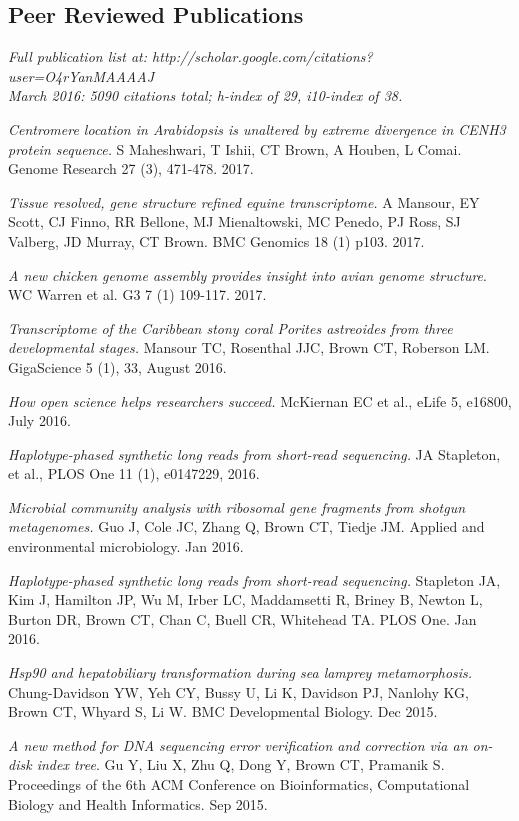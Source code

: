 \documentclass[margin,line]{resume}
\begin{document}
\begin{resume}
    \section{\mysidestyle Peer Reviewed Publications}

{\em Full publication list at: http://scholar.google.com/citations?user=O4rYanMAAAAJ\\
  March 2016: 5090 citations total; h-index of 29, i10-index of 38.}

{\em Centromere location in Arabidopsis is unaltered by extreme divergence in CENH3 protein sequence.} S Maheshwari, T Ishii, CT Brown, A Houben, L Comai. Genome Research 27 (3), 471-478. 2017.

{\em Tissue resolved, gene structure refined equine transcriptome.} A Mansour, EY Scott, CJ Finno, RR Bellone, MJ Mienaltowski, MC Penedo, PJ Ross, SJ Valberg, JD Murray, CT Brown. BMC Genomics 18 (1) p103. 2017.

{\em A new chicken genome assembly provides insight into avian genome structure}. WC Warren et al. G3 7 (1) 109-117. 2017.

{\em Transcriptome of the Caribbean stony coral Porites astreoides from three developmental stages.} Mansour TC, Rosenthal JJC, Brown CT, Roberson LM.
GigaScience 5 (1), 33, August 2016.

{\em How open science helps researchers succeed.}
McKiernan EC et al., eLife 5, e16800, July 2016.

{\em Haplotype-phased synthetic long reads from short-read sequencing.}
JA Stapleton, et al.,
PLOS One 11 (1), e0147229, 2016.

{\em Microbial community analysis with ribosomal gene fragments from shotgun metagenomes.} Guo J, Cole JC, Zhang Q, Brown CT, Tiedje JM. Applied and environmental microbiology. Jan 2016.

{\em Haplotype-phased synthetic long reads from short-read sequencing.} Stapleton JA, Kim J, Hamilton JP, Wu M, Irber LC, Maddamsetti R, Briney B, Newton L, Burton DR, Brown CT, Chan C, Buell CR, Whitehead TA. PLOS One. Jan 2016.

{\em Hsp90 and hepatobiliary transformation during sea lamprey metamorphosis.}
Chung-Davidson YW, Yeh CY, Bussy U, Li K, Davidson PJ, Nanlohy KG, Brown CT, Whyard S, Li W. BMC Developmental Biology. Dec 2015.

\newpage

{\em A new method for DNA sequencing error verification and correction via an on-disk index tree}. Gu Y, Liu X, Zhu Q, Dong Y, Brown CT, Pramanik S.  Proceedings of the 6th ACM Conference on Bioinformatics, Computational Biology and Health Informatics. Sep 2015.


\end{resume}
\end{document}
